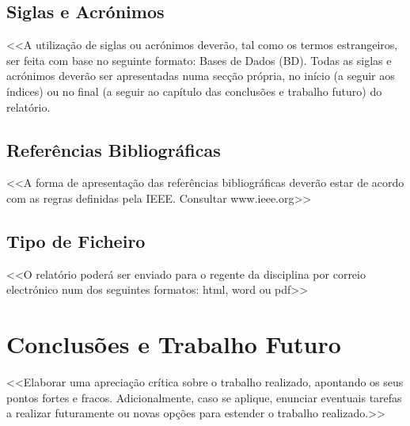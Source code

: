 \documentclass[a4paper,12pt]{scrreprt}
\begin{document}
        
    \section{Siglas e Acrónimos}
        <<A utilização de siglas ou acrónimos deverão, tal como os termos estrangeiros, ser feita com base no seguinte formato: Bases de Dados (BD). Todas as siglas e acrónimos deverão ser apresentadas numa secção própria, no início (a seguir aos índices) ou no final (a seguir ao capítulo das conclusões e trabalho futuro) do relatório.
    \section{Referências Bibliográficas}
        <<A forma de apresentação das referências bibliográficas deverão estar de acordo com as regras definidas pela IEEE. Consultar www.ieee.org>>
    \section{Tipo de Ficheiro}
        <<O relatório poderá ser enviado para o regente da disciplina por correio electrónico num dos seguintes formatos: html, word ou pdf>>
   
        


\chapter{Conclusões e Trabalho Futuro}
    <<Elaborar uma apreciação crítica sobre o trabalho realizado, apontando os seus pontos fortes e fracos. Adicionalmente, caso se aplique, enunciar eventuais tarefas a realizar futuramente ou novas opções para estender o trabalho realizado.>>



\end{document}
